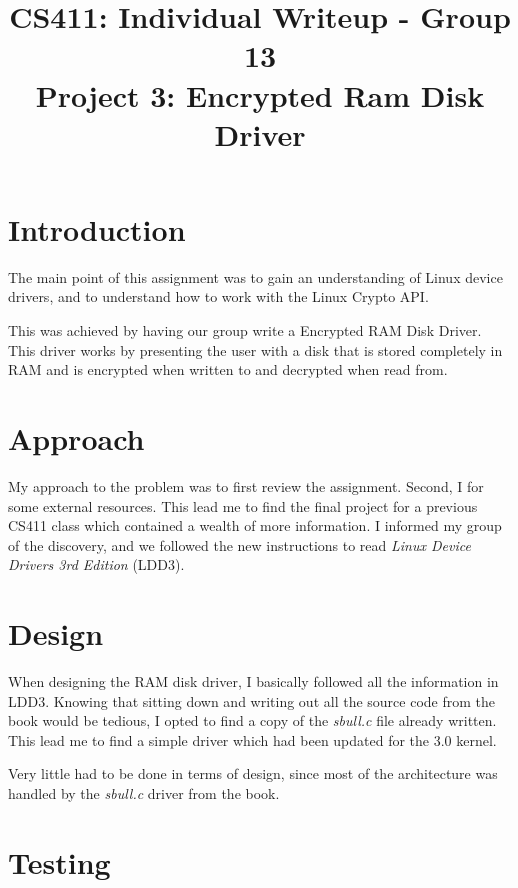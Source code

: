 \documentclass[letterpaper,10pt,titlepage]{article}
\title{CS411: Individual Writeup - Group 13\\
    Project 3: Encrypted Ram Disk Driver}
\author{\name}
\begin{document}
\maketitle

\section*{Introduction}

The main point of this assignment was to gain an understanding of
Linux device drivers, and to understand how to work with the Linux
Crypto API.

This was achieved by having our group write a Encrypted RAM Disk 
Driver. This driver works by presenting the user with a disk that is
stored completely in RAM and is encrypted when written to and
decrypted when read from.

\section*{Approach}

My approach to the problem was to first review the assignment. Second, I
for some external resources. This lead me to find the final project for
a previous CS411 class which contained a wealth of more information. I
informed my group of the discovery, and we followed the new instructions
to read \emph{Linux Device Drivers 3rd Edition} (LDD3).

\section*{Design}

When designing the RAM disk driver, I basically followed all the
information in LDD3. Knowing that sitting down and writing out all the
source code from the book would be tedious, I opted to find a copy of
the \emph{sbull.c} file already written. This lead me to find a
simple driver which had been updated for the 3.0 kernel.

Very little had to be done in terms of design, since most of the
architecture was handled by the \emph{sbull.c} driver from the book.

\section*{Testing}
\end{document}
